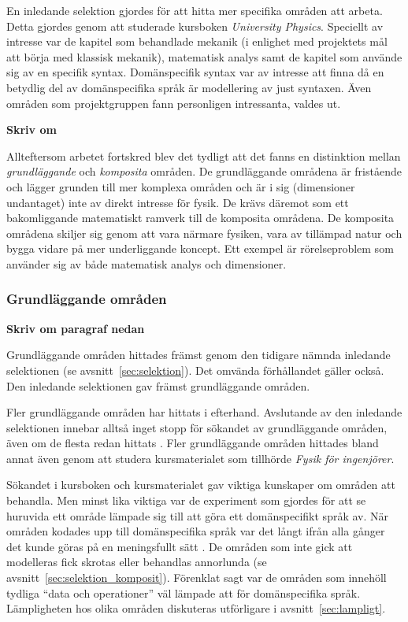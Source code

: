 \begin{binge}
En inledande selektion gjordes för att hitta mer specifika områden att arbeta.
Detta gjordes genom att studerade kursboken \textit{University Physics}.
Speciellt av intresse var de kapitel som behandlade mekanik (i enlighet med
projektets mål att börja med klassisk mekanik), matematisk analys samt de
kapitel som använde sig av en specifik syntax. Domänspecifik syntax var av
intresse att finna då en betydlig del av domänspecifika språk är modellering av
just syntaxen. 
Även områden som projektgruppen fann personligen intressanta, valdes ut.


\textbf{Skriv om}

Allteftersom arbetet fortskred blev det tydligt att det fanns en distinktion
mellan \textit{grundläggande} och \textit{komposita} områden. De grundläggande
områdena är fristående och lägger grunden till mer komplexa områden och är i sig
(dimensioner undantaget) inte av direkt intresse för fysik. De krävs däremot
som ett bakomliggande matematiskt ramverk till de komposita områdena. 
De komposita områdena skiljer sig genom att vara närmare fysiken, vara av
tillämpad natur och bygga vidare på mer underliggande koncept. Ett exempel är
rörelseproblem som använder sig av både matematisk analys och dimensioner.

\subsubsection{Grundläggande områden}

\textbf{Skriv om paragraf nedan}

Grundläggande områden hittades främst genom den tidigare nämnda inledande
selektionen (se avsnitt~\ref{sec:selektion}). Det omvända förhållandet gäller
också. Den inledande selektionen gav främst grundläggande områden. 

Fler grundläggande områden har hittats i efterhand. Avslutande av den inledande
selektionen innebar alltså inget stopp för sökandet av grundläggande områden,
även om de flesta redan hittats . Fler grundläggande områden hittades bland annat även genom att
studera kursmaterialet som tillhörde \textit{Fysik för ingenjörer}.

Sökandet i kursboken och kursmaterialet gav viktiga kunskaper om områden att
behandla. Men minst lika viktiga var de experiment som gjordes för att se
huruvida ett område lämpade sig till att göra ett domänspecifikt språk av. När
områden kodades upp till domänspecifika språk var det långt ifrån alla gånger
det kunde göras på en meningsfullt sätt . De
områden som inte gick att modelleras fick skrotas eller behandlas annorlunda
(se avsnitt~\ref{sec:selektion_komposit}). Förenklat sagt var de områden som
innehöll tydliga ``data och operationer'' väl lämpade att för domänspecifika
språk. Lämpligheten hos olika områden diskuteras utförligare i
avsnitt~\ref{sec:lampligt}.


\end{binge}
